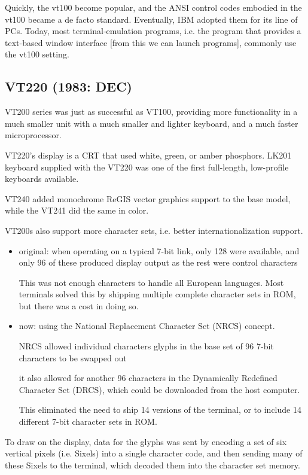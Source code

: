 Quickly, the vt100 become popular, and the ANSI control codes embodied
in the vt100 became a de facto standard. Eventually, IBM adopted them for its line of
PCs.  Today, most terminal-emulation programs, i.e. the program that provides a
text-based window interface [from this we can launch programs], commonly use the
vt100 setting.

\subsection{VT220 (1983: DEC)}


VT200 series was just as successful as VT100, providing more functionality in a
much smaller unit with a much smaller and lighter keyboard, and a much faster
microprocessor.

VT220's display is a CRT that used white, green, or amber phosphors.
LK201 keyboard supplied with the VT220 was one of the first full-length,
low-profile keyboards available.

VT240 added monochrome ReGIS vector graphics support to the base model, while
the VT241 did the same in color. 


VT200s also support more character sets, i.e. better internationalization
support. 
\begin{itemize}
  
  \item original: when operating on a typical 7-bit link, only 128 were
  available, and only 96 of these produced display output as the rest were
  control characters
  
  This was not enough characters to handle all European languages. 
  Most terminals solved this by shipping multiple complete character sets in
  ROM, but there was a cost in doing so.
  
  \item 
  now: using the National Replacement Character Set (NRCS) concept.
  
  NRCS allowed individual characters glyphs in the base set of 96 7-bit
  characters to be swapped out

   it also allowed for another 96 characters in the Dynamically Redefined
   Character Set (DRCS), which could be downloaded from the host computer.
  
  This eliminated the need to ship 14 versions of the terminal, or to include 14
  different 7-bit character sets in ROM.
\end{itemize}

To draw on the display, data for the glyphs was sent by encoding a set of six
vertical pixels (i.e. Sixels) into a single character code, and then sending
many of these Sixels to the terminal, which decoded them into the character set
memory.


